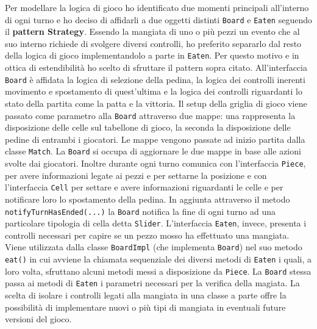 \documentclass[a4paper,12pt]{report}
\begin{document}
Per modellare la logica di gioco ho identificato due momenti principali all’interno di ogni turno e ho deciso di affidarli a due oggetti distinti \texttt{Board}  e \texttt{Eaten} seguendo il \textbf{pattern Strategy}. Essendo la mangiata di uno o più pezzi un evento che al suo interno richiede di svolgere diversi controlli, ho preferito separarlo dal resto della logica di gioco implementandolo a parte in \texttt{Eaten}. Per questo motivo e in ottica di estendibilità ho scelto di sfruttare il pattern sopra citato.
All’interfaccia \texttt{Board} è affidata la logica di selezione della pedina, la logica dei controlli inerenti movimento e spostamento di quest’ultima e la logica dei controlli riguardanti lo stato della partita come la patta e la vittoria. Il setup della griglia di gioco viene passato come parametro alla \texttt{Board} attraverso due mappe: una rappresenta la disposizione delle celle sul tabellone di gioco, la seconda la disposizione delle pedine di entrambi i giocatori. Le mappe vengono passate ad inizio partita dalla classe \texttt{Match}.
La \texttt{Board} si occupa di aggiornare le due mappe in base alle azioni svolte dai giocatori. Inoltre durante ogni turno comunica con l'interfaccia \texttt{Piece}, per avere informazioni legate ai pezzi e per settarne la posizione e con l'interfaccia \texttt{Cell} per settare e avere informazioni riguardanti le celle e per notificare loro lo spostamento della pedina. In aggiunta attraverso il metodo \texttt{notifyTurnHasEnded(...)} la \texttt{Board} notifica la fine di ogni turno ad una particolare tipologia di cella detta \texttt{Slider}.
L'interfaccia \texttt{Eaten}, invece, presenta i controlli necessari per capire se un pezzo mosso ha effettuato una mangiata. Viene utilizzata dalla classe \texttt{BoardImpl} (che implementa \texttt{Board}) nel suo metodo \texttt{eat()} in cui avviene la chiamata sequenziale dei diversi metodi di \texttt{Eaten}  i quali, a loro volta, sfruttano alcuni metodi messi a disposizione da \texttt{Piece}. La \texttt{Board} stessa passa ai metodi di \texttt{Eaten} i parametri necessari per la verifica della magiata.
La scelta di isolare i controlli legati alla mangiata in una classe a parte offre la possibilità di implementare nuovi o più tipi di mangiata in eventuali future versioni del gioco.
\end{document}
